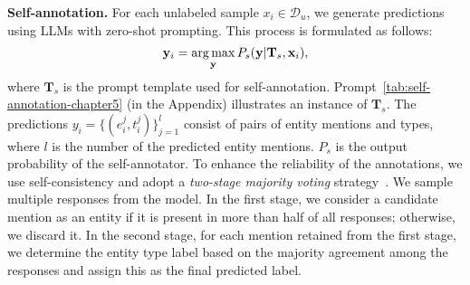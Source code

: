 \noindent \textbf{Self-annotation.} 
For each unlabeled sample $x_i\in\mathcal{D}_{u}$, we generate predictions using LLMs with zero-shot prompting. This process is formulated as follows:
\begin{equation}
\setlength{\abovedisplayskip}{6pt}
\setlength{\belowdisplayskip}{6pt}
\mathbf{y}_i = \mathop{\arg\max}_{\mathbf{y}} P_{s}(\mathbf{y} | \mathbf{T}_{s}, \mathbf{x}_i),
\end{equation}
\noindent
where $\mathbf{T}_{s}$ is the prompt template used for self-annotation. Prompt~\ref{tab:self-annotation-chapter5} (in the Appendix) illustrates an instance of $\mathbf{T}_{s}$. 
The predictions $y_i = \{(e_i^j, t_i^j)\}_{j=1}^{l}$ consist of pairs of entity mentions and types, where $l$ is the number of the predicted entity mentions. $P_{s}$ is the output probability of the self-annotator. To enhance the reliability of the annotations, we use self-consistency \citep{wang2022self} and adopt a \emph{two-stage majority voting} strategy~\citep{DBLP:conf/emnlp/XieLZZLW23}. 
We sample multiple responses from the model. In the first stage, we consider a candidate mention as an entity if it is present in more than half of all responses; otherwise, we discard it. In the second stage, for each mention retained from the first stage, we determine the entity type label based on the majority agreement among the responses and assign this as the final predicted label.


